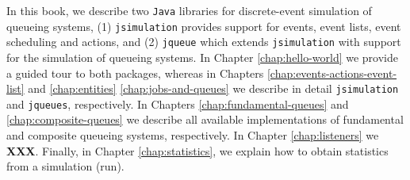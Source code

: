 In this book, we describe two \lstinline|Java|
  libraries for discrete-event simulation of queueing systems, (1) \lstinline|jsimulation|
  provides support for events, event lists, event scheduling and actions, and (2) \lstinline|jqueue| which
  extends \lstinline|jsimulation| with support
  for the simulation of queueing systems.
In Chapter \ref{chap:hello-world}
  we provide a guided tour
  to both packages,
  whereas in Chapters
  \ref{chap:events-actions-event-list}
  and
  \ref{chap:entities}
  \ref{chap:jobs-and-queues}
  we describe in detail
  \lstinline|jsimulation|
  and \lstinline|jqueues|,
  respectively.
In Chapters \ref{chap:fundamental-queues}
  and \ref{chap:composite-queues} we describe
  all available implementations
  of fundamental and composite
  queueing systems,
  respectively.
In Chapter \ref{chap:listeners} we {\bf XXX}.
Finally, in Chapter \ref{chap:statistics},
  we explain how to obtain statistics
  from a simulation (run).

